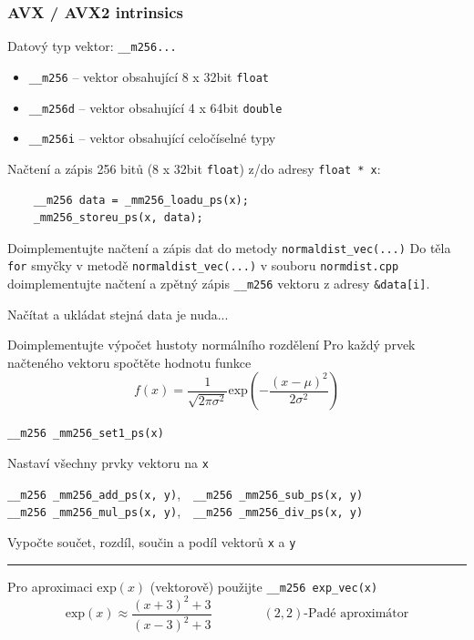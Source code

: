 \documentclass[usenames,dvipsnames,9pt]{beamer}
\begin{document}
{
\begin{frame}[fragile]
  \frametitle{AVX / AVX2 intrinsics}

  Datový typ vektor: \texttt{\_\_m256...}
  \begin{itemize}
    \item \texttt{\_\_m256} -- vektor obsahující 8 x 32bit \texttt{float}
    \item \texttt{\_\_m256d} -- vektor obsahující 4 x 64bit \texttt{double}
    \item \texttt{\_\_m256i} -- vektor obsahující celočíselné typy
  \end{itemize}

  Načtení a zápis 256 bitů (8 x 32bit \texttt{float}) z/do adresy \texttt{float * x}:
  \begin{verbatim}
    __m256 data = _mm256_loadu_ps(x);
    _mm256_storeu_ps(x, data);
  \end{verbatim}

  \vspace{1.5em}
  \pause

  \begin{block}{Doimplementujte načtení a zápis dat do metody \texttt{normaldist\_vec(...)}}
    Do těla \texttt{for} smyčky v metodě \texttt{normaldist\_vec(...)} v souboru \texttt{normdist.cpp} doimplementujte načtení a zpětný zápis \texttt{\_\_m256} vektoru z adresy \texttt{\&data[i]}.
  \end{block}
\end{frame}

\begin{frame}[fragile]
  Načítat a ukládat stejná data je nuda...
  \begin{block}{Doimplementujte výpočet hustoty normálního rozdělení}
    Pro každý prvek načteného vektoru spočtěte hodnotu funkce
    \[ f(x)=\frac{1}{\sqrt{2\pi\sigma^2}} \mathrm{exp}\left( -\frac{(x-\mu)^2}{2\sigma^2} \right) \]
  \end{block}

  \texttt{__m256 _mm256_set1_ps(x)}

  \vspace{-0.35em}\hspace{10pt} Nastaví všechny prvky vektoru na \texttt{x}

  \texttt{__m256 _mm256_add_ps(x, y)},\ \ \texttt{__m256 _mm256_sub_ps(x, y)} \\
  \texttt{__m256 _mm256_mul_ps(x, y)},\ \ \texttt{__m256 _mm256_div_ps(x, y)}

  \vspace{-0.35em}\hspace{10pt} Vypočte součet, rozdíl, součin a podíl vektorů \texttt{x} a \texttt{y}

  \vspace{1em}\hrule\vspace{1em}
  Pro aproximaci $\mathrm{exp}(x)$ (vektorově) použijte \texttt{__m256 exp_vec(x)}
  \[ \mathrm{exp}(x) \approx \frac{(x+3)^2 + 3}{(x-3)^2 + 3} \qquad\qquad (2,2)\text{-Padé aproximátor} \]
\end{frame}
}
\end{document}
